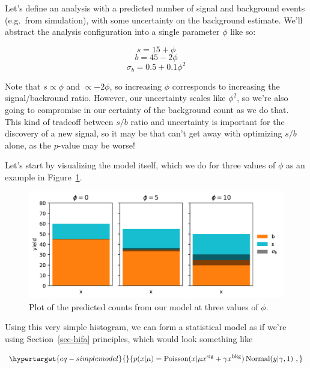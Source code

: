 \documentclass[
  11pt,
  numbers=noendperiod]{book}
\begin{document}
Let's define an analysis with a predicted number of signal and
background events (e.g.~from simulation), with some uncertainty on the
background estimate. We'll abstract the analysis configuration into a
single parameter \(\phi\) like so:

\[s = 15 + \phi \] \[b = 45 - 2 \phi \] \[\sigma_b = 0.5 + 0.1\phi^2 \]

Note that \(s \propto \phi\) and \(\propto -2\phi\), so increasing
\(\phi\) corresponds to increasing the signal/backround ratio. However,
our uncertainty scales like \(\phi^2\), so we're also going to
compromise in our certainty of the background count as we do that. This
kind of tradeoff between \(s/b\) ratio and uncertainty is important for
the discovery of a new signal, so it may be that can't get away with
optimizing \(s/b\) alone, as the \(p\)-value may be worse!

Let's start by visualizing the model itself, which we do for three
values of \(\phi\) as an example in Figure~\ref{fig-simple-model}.

\begin{figure}

{\centering \includegraphics{./diffprog-hep_files/figure-pdf/fig-simple-model-output-1.pdf}

}

\caption{\label{fig-simple-model}Plot of the predicted counts from our
model at three values of \(\phi\).}

\end{figure}

Using this very simple histogram, we can form a statistical model as if
we're using Section~\ref{sec-hifa} principles, which would look
something like

\begin{equation}\protect\hypertarget{eq-simplemodel}{}{
p(x | \mu) = \mathrm{Poisson}(x | \mu x^{\mathrm{sig}}  + \gamma x^{\mathrm{bkg}})\,\mathrm{Normal}(y | \gamma, 1)~,
}\label{eq-simplemodel}\end{equation}
\end{document}
